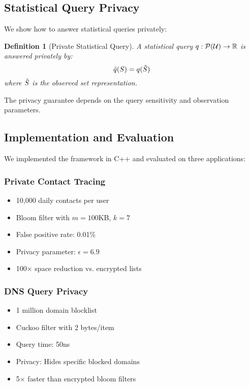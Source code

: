 \documentclass[11pt]{article}
\newtheorem{definition}{Definition}
\begin{document}
\subsection{Statistical Query Privacy}

We show how to answer statistical queries privately:

\begin{definition}[Private Statistical Query]
A statistical query $q: \mathcal{P}(\mathcal{U}) \to \mathbb{R}$ is answered privately by:
$$\tilde{q}(S) = q(\tilde{S})$$
where $\tilde{S}$ is the observed set representation.
\end{definition}

The privacy guarantee depends on the query sensitivity and observation parameters.

\subsection{Implementation and Evaluation}

We implemented the framework in C++ and evaluated on three applications:

\subsubsection{Private Contact Tracing}
\begin{itemize}
\item 10,000 daily contacts per user
\item Bloom filter with $m = 100$KB, $k = 7$
\item False positive rate: 0.01\%
\item Privacy parameter: $\epsilon = 6.9$
\item 100× space reduction vs. encrypted lists
\end{itemize}

\subsubsection{DNS Query Privacy}
\begin{itemize}
\item 1 million domain blocklist
\item Cuckoo filter with 2 bytes/item
\item Query time: 50ns
\item Privacy: Hides specific blocked domains
\item 5× faster than encrypted bloom filters
\end{itemize}
\end{document}
